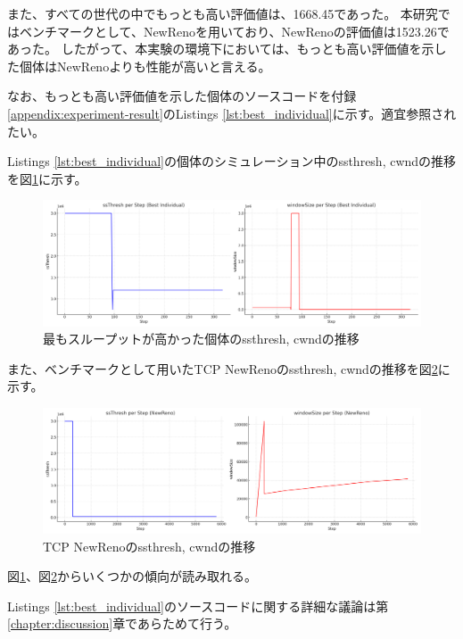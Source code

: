 \documentclass[a4paper,11pt]{jreport}
\newcommand{\figref}[1]{図\ref{#1}}
\newcommand{\chapref}[1]{第\ref{#1}章}
\newcommand{\appendixref}[1]{付録\ref{#1}}
\begin{document}

また、すべての世代の中でもっとも高い評価値は、1668.45であった。
本研究ではベンチマークとして、NewRenoを用いており、NewRenoの評価値は1523.26であった。
したがって、本実験の環境下においては、もっとも高い評価値を示した個体はNewRenoよりも性能が高いと言える。

なお、もっとも高い評価値を示した個体のソースコードを\appendixref{appendix:experiment-result}のListings \ref{lst:best_individual}に示す。適宜参照されたい。

Listings \ref{lst:best_individual}の個体のシミュレーション中のssthresh, cwndの推移を\figref{figure:best_individual_result}に示す。
\begin{figure}[htbp]
  \centering
  \includegraphics[width=1.0\linewidth]{fig/chap05/best_result.png}
  \caption{最もスループットが高かった個体のssthresh, cwndの推移}
  \label{figure:best_individual_result}
\end{figure}
また、ベンチマークとして用いたTCP NewRenoのssthresh, cwndの推移を\figref{figure:newreno_result}に示す。
\begin{figure}[htbp]
  \centering
  \includegraphics[width=1.0\linewidth]{fig/chap05/newreno_result.png}
  \caption{TCP NewRenoのssthresh, cwndの推移}
  \label{figure:newreno_result}
\end{figure}
\figref{figure:best_individual_result}、\figref{figure:newreno_result}からいくつかの傾向が読み取れる。


Listings \ref{lst:best_individual}のソースコードに関する詳細な議論は\chapref{chapter:discussion}であらためて行う。
\end{document}
